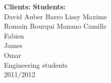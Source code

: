 \begin{titlepage}
        \vspace{4cm}
        \begin{flushleft}
	  \begin{tabbing}
                \noindent \textbf{Clients:}
                \hspace{9.5cm} \=\textbf{Students:} \\
                \noindent David {\sc Auber}
                \> {\sc Barro} Lissy Maxime\\
                \noindent Romain {\sc Bourqui}
                \> {\sc Manano} Camille\\
                 Fabien\\
		 James\\
                 Omar\\[0.3 cm]
                \>Engineering students \\
                 2011/2012\\
	  \end{tabbing}
        \end{flushleft}


\end{titlepage}
